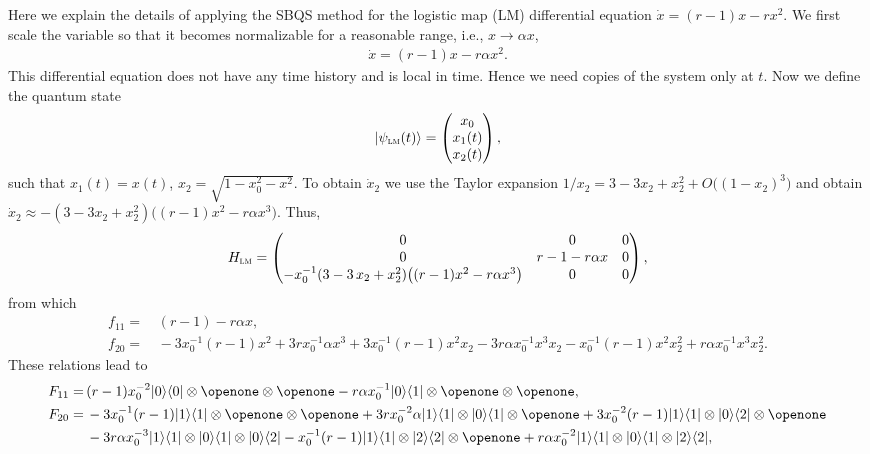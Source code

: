 \documentclass[aps,pra,twocolumn,floatfix,groupedaddress,superscriptaddress,nofootinbib,notitlepage]{revtex4-2}
\begin{document}
Here we explain the details of applying the SBQS method for the logistic map (LM) differential equation $\dot{x}= (r-1) x-r x^{2}$. We first scale the variable so that it becomes normalizable for a reasonable range, i.e., $x \to \alpha x$,
\begin{align}
\dot{x}= (r-1) x-r \alpha x^{2} .
\label{logistic}
\end{align}
This differential equation does not have any time history and is local in time. Hence we need copies of the system only at $t$.
Now we define the quantum state 
\begin{align}
|\psi_{\textsc{lm}}(t)\rangle=\left(\begin{matrix}
 x_{0} \\
 x_{1}(t) \\
 x_{2}(t)
\end{matrix} \right), 
\end{align}
such that $x_{1}(t)=x(t)$, $x_{2}=\sqrt{1-x_{0}^{2}- x^{2}}$. To obtain $\dot{x}_{2}$ we use the Taylor expansion $1/x_{2}=3 -3x_{2} +x_{2}^{2} + O\big((1-x_{2})^{3}\big)$ and obtain $\dot{x}_{2} \approx -(3 -3x_{2} +x_{2}^{2}) \big( (r-1) x^{2}-r \alpha x^{3}\big)$. Thus, 
\begin{align}
H_{\textsc{lm}} = \left(\begin{matrix} 0 & 0 & 0 \\ 0 & r-1-r \alpha x  & 0 \\ -x_{0}^{-1} (3 -3\,x_{2} +x_{2}^{2}) \big((r-1) x^{2}-r \alpha x^{3}\big) & 0 & 0 \end{matrix}\right), \end{align}
from which
\begin{align}
f_{11}=&\, (r-1) -r \alpha x, \\
f_{20}=&\, -3 x_{0}^{-1} (r-1) x^{2} + 3 r x_{0}^{-1} \alpha x^{3} +3 x_{0}^{-1}  (r-1)  x^{2} x_{2} - 3r \alpha x_{0}^{-1}  x^{3} x_{2}-x_{0}^{-1} (r-1) x^{2} x_{2}^{2}+ r \alpha x_{0}^{-1} x^{3} x_{2}^{2}.
\end{align}
These relations lead to
\begin{align}
\label{g6}
F_{11} = &\, (r-1) x_{0}^{-2}|0\rangle\langle 0|\otimes \openone\otimes \openone -r \alpha x_{0}^{-1} |0\rangle\langle 1|\otimes \openone\otimes \openone, \\
\label{g7}
F_{20} = &\, -3 x_{0}^{-1} (r-1) |1\rangle\langle 1| \otimes \openone \otimes \openone+ 3 r x_{0}^{-2} \alpha |1\rangle\langle 1|\otimes |0\rangle\langle 1| \otimes \openone+3 x_{0}^{-2}  (r-1) |1\rangle\langle 1|\otimes |0\rangle\langle 2|\otimes \openone \nonumber\\
&\, - 3r \alpha x_{0}^{-3} |1\rangle\langle 1|\otimes |0\rangle\langle 1|\otimes |0\rangle\langle 2|-x_{0}^{-1} (r-1) |1\rangle\langle 1|\otimes |2\rangle\langle 2|\otimes \openone + r \alpha x_{0}^{-2} |1\rangle\langle 1|\otimes |0\rangle\langle 1|\otimes |2\rangle \langle 2|,
\end{align}
\end{document}
